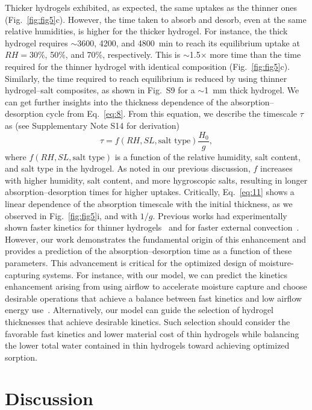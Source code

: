 \documentclass[11pt]{article}
\begin{document}
Thicker hydrogels exhibited, as expected, the same uptakes as the thinner ones (Fig.~\ref{fig:fig5}c). However, the time taken to absorb and desorb, even at the same relative humidities, is higher for the thicker hydrogel. For instance, the thick hydrogel requires $\sim$3600, 4200, and 4800~min to reach its equilibrium uptake at $RH = 30\%$, 50\%, and 70\%, respectively. This is $\sim$1.5$\times$ more time than the time required for the thinner hydrogel with identical composition (Fig.~\ref{fig:fig5}c). Similarly, the time required to reach equilibrium is reduced by using thinner hydrogel--salt composites, as shown in Fig.~S9 for a $\sim$1~mm thick hydrogel. We can get further insights into the thickness dependence of the absorption--desorption cycle from Eq.~\ref{eq:8}. From this equation, we describe the timescale $\tau$ as (see Supplementary Note S14 for derivation)
\begin{equation}
\tau = f\left(RH, SL, \text{salt type}\right) \frac{H_0}{g},
\label{eq:11}
\end{equation}
where $f(RH, SL, \text{salt type})$ is a function of the relative humidity, salt content, and salt type in the hydrogel. As noted in our previous discussion, $f$ increases with higher humidity, salt content, and more hygroscopic salts, resulting in longer absorption--desorption times for higher uptakes. Critically, Eq.~\ref{eq:11} shows a linear dependence of the absorption timescale with the initial thickness, as we observed in Fig.~\ref{fig:fig5}i, and with $1/g$. Previous works had experimentally shown faster kinetics for thinner hydrogels~\cite{guo2022,guan2022b} and for faster external convection~\cite{xu2021}. However, our work demonstrates the fundamental origin of this enhancement and provides a prediction of the absorption--desorption time as a function of these parameters. This advancement is critical for the optimized design of moisture-capturing systems. For instance, with our model, we can predict the kinetics enhancement arising from using airflow to accelerate moisture capture and choose desirable operations that achieve a balance between fast kinetics and low airflow energy use~\cite{narayanan2014}. Alternatively, our model can guide the selection of hydrogel thicknesses that achieve desirable kinetics. Such selection should consider the favorable fast kinetics and lower material cost of thin hydrogels while balancing the lower total water contained in thin hydrogels toward achieving optimized sorption.

\section{Discussion}
\end{document}
